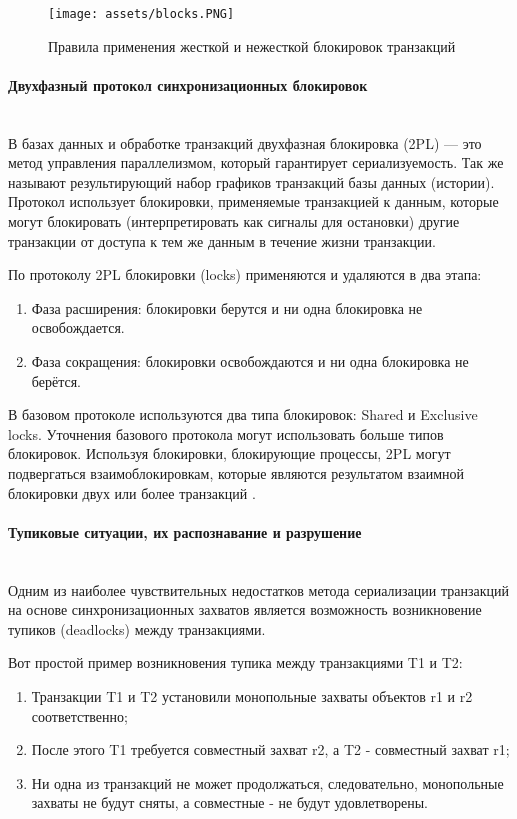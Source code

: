 \begin{figure}[h!]
    \centering
    \texttt{[image: assets/blocks.PNG]}
    \caption{Правила применения жесткой и нежесткой блокировок транзакций}
\end{figure}


\paragraph{Двухфазный протокол синхронизационных блокировок}~\\

В базах данных и обработке транзакций двухфазная блокировка (2PL) — это метод управления параллелизмом, который гарантирует сериализуемость. Так же называют результирующий набор графиков транзакций базы данных (истории). Протокол использует блокировки, применяемые транзакцией к данным, которые могут блокировать (интерпретировать как сигналы для остановки) другие транзакции от доступа к тем же данным в течение жизни транзакции.


По протоколу 2PL блокировки (locks) применяются и удаляются в два этапа:

\begin{enumerate}
    \item Фаза расширения: блокировки берутся и ни одна блокировка не освобождается.
    \item Фаза сокращения: блокировки освобождаются и ни одна блокировка не берётся.
\end{enumerate}

В базовом протоколе используются два типа блокировок: Shared и Exclusive locks. Уточнения базового протокола могут использовать больше типов блокировок. Используя блокировки, блокирующие процессы, 2PL могут подвергаться взаимоблокировкам, которые являются результатом взаимной блокировки двух или более транзакций \autocite{Wiki}.

\paragraph{Тупиковые ситуации, их распознавание и разрушение} ~\\

Одним из наиболее чувствительных недостатков метода сериализации транзакций на основе синхронизационных захватов является возможность возникновение тупиков (deadlocks) между транзакциями.

Вот простой пример возникновения тупика между транзакциями T1 и T2:
\begin{enumerate}
    \item Транзакции T1 и T2 установили монопольные захваты объектов r1 и r2 соответственно;
    \item После этого T1 требуется совместный захват r2, а T2 - совместный захват r1;
    \item Ни одна из транзакций не может продолжаться, следовательно, монопольные захваты не будут сняты, а совместные - не будут удовлетворены.
\end{enumerate}

